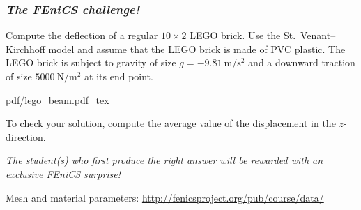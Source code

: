 \begin{frame}
  \frametitle{\emph{The FEniCS challenge!}}

  Compute the deflection of a regular $10 \times 2 $ LEGO brick. Use
  the St.~Venant--Kirchhoff model and assume that the LEGO brick is
  made of PVC plastic. The LEGO brick is subject to gravity of size $g
  = -9.81~\mathrm{m}/\mathrm{s}^2$ and a downward traction of size
  $5000~\mathrm{N}/\mathrm{m}^2$ at its end point.

  \begin{center}
    \def\svgwidth{0.6\textwidth}
    {pdf/lego_beam.pdf_tex}
  \end{center}

  To check your solution, compute the average value of the
  displacement in the $z$-direction.

  \emph{The student(s) who first produce the right answer will be
    rewarded with an exclusive FEniCS surprise!}

  {\footnotesize Mesh and material parameters:
    \url{http://fenicsproject.org/pub/course/data/}}

\end{frame}
